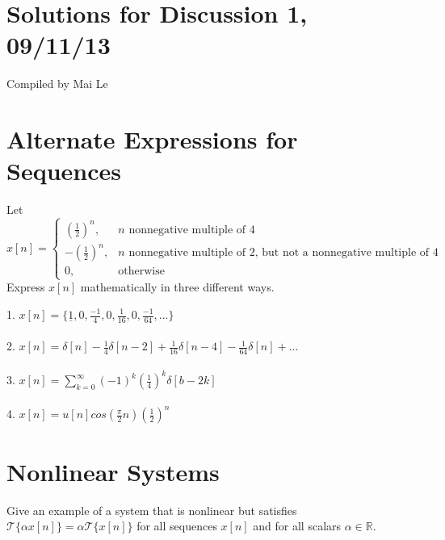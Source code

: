 \documentclass[11pt]{article}
\begin{document}
\section*{Solutions for Discussion 1, 09/11/13}
Compiled by Mai Le

\section{Alternate Expressions for Sequences}
Let $x[n] = \begin{cases} \left(\frac{1}{2}\right)^n, & n \text{ nonnegative multiple of 4} \\ -\left(\frac{1}{2}\right)^n, & n \text{ nonnegative multiple of 2, but not a nonnegative multiple of 4} \\ 0, & \text{otherwise}\end{cases}$ \\
Express $x[n]$ mathematically in three different ways.

{\color{blue}
1. $x[n] = \{\underline{1}, 0, \frac{-1}{4}, 0, \frac{1}{16}, 0, \frac{-1}{64},... \}$ \\
\\
2. $x[n] = \delta[n]-\frac{1}{4}\delta[n-2]+\frac{1}{16}\delta[n-4]-\frac{1}{64}\delta[n]+...$ \\ \\
3. $x[n] = \sum\limits_{k=0}^\infty (-1)^k(\frac{1}{4})^k\delta[b-2k]$ \\ \\
4. $x[n] = u[n]cos\left(\frac{\pi}{2}n\right)\left(\frac{1}{2}\right)^n$ }

\section{Nonlinear Systems}
Give an example of a system that is nonlinear but satisfies $\mathcal{T}\{\alpha x[n]\} = \alpha \mathcal{T}\{x[n]\}$ for all sequences $x[n]$ and for all scalars $\alpha \in \mathbb{R}$.
\end{document}
